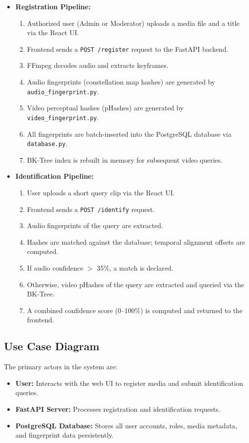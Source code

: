\begin{itemize}
  \item \textbf{Registration Pipeline:}
    \begin{enumerate}
      \item Authorized user (Admin or Moderator) uploads a media file and a title via the React UI.
      \item Frontend sends a \texttt{POST /register} request to the FastAPI backend.
      \item FFmpeg decodes audio and extracts keyframes.
      \item Audio fingerprints (constellation map hashes) are generated by \texttt{audio\_fingerprint.py}.
      \item Video perceptual hashes (pHashes) are generated by \texttt{video\_fingerprint.py}.
      \item All fingerprints are batch-inserted into the PostgreSQL database via \texttt{database.py}.
      \item BK-Tree index is rebuilt in memory for subsequent video queries.
    \end{enumerate}
  \item \textbf{Identification Pipeline:}
    \begin{enumerate}
      \item User uploads a short query clip via the React UI.
      \item Frontend sends a \texttt{POST /identify} request.
      \item Audio fingerprints of the query are extracted.
      \item Hashes are matched against the database; temporal alignment offsets are computed.
      \item If audio confidence $>$ 35\%, a match is declared.
      \item Otherwise, video pHashes of the query are extracted and queried via the BK-Tree.
      \item A combined confidence score (0--100\%) is computed and returned to the frontend.
    \end{enumerate}
\end{itemize}

\subsection{Use Case Diagram}
The primary actors in the system are:
\begin{itemize}
  \item \textbf{User:} Interacts with the web UI to register media and submit identification queries.
  \item \textbf{FastAPI Server:} Processes registration and identification requests.
  \item \textbf{PostgreSQL Database:} Stores all user accounts, roles, media metadata, and fingerprint data persistently.
\end{itemize}

